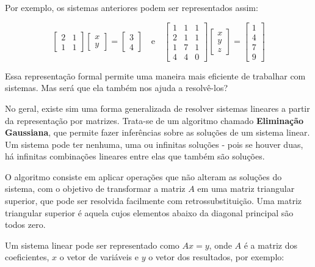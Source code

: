 \documentclass[11pt, a4paper]{article}
\begin{document}
Por exemplo, os sistemas anteriores podem ser representados assim:

\void[-0.5]

\[
\begin{bmatrix}
2 & 1\\
1 & 1
\end{bmatrix}
\begin{bmatrix}
x\\
y
\end{bmatrix}
=
\begin{bmatrix}
3\\
4
\end{bmatrix}
\quad \text{e} \quad
\begin{bmatrix}
1 & 1 & 1\\
2 & 1 & 1\\
1 & 7 & 1\\
4 & 4 & 0
\end{bmatrix}
\begin{bmatrix}
x\\
y\\
z
\end{bmatrix}
=
\begin{bmatrix}
1\\
4\\
7\\
9
\end{bmatrix}
\]

Essa representação formal permite uma maneira mais eficiente de trabalhar com sistemas. Mas será que ela também nos ajuda a resolvê-los?

No geral, existe sim uma forma generalizada de resolver sistemas lineares a partir da representação por matrizes. Trata-se de um algoritmo chamado \textbf{Eliminação Gaussiana}, que permite fazer inferências sobre as soluções de um sistema linear. Um sistema pode ter nenhuma, uma ou infinitas soluções - pois se houver duas, há infinitas combinações lineares entre elas que também são soluções.

O algoritmo consiste em aplicar operações que não alteram as soluções do sistema, com o objetivo de transformar a matriz \(A\) em uma matriz triangular superior, que pode ser resolvida facilmente com retrossubstituição. Uma matriz triangular superior é aquela cujos elementos abaixo da diagonal principal são todos zero.

Um sistema linear pode ser representado como \(Ax = y\), onde \(A\) é a matriz dos coeficientes, \(x\) o vetor de variáveis e \(y\) o vetor dos resultados, por exemplo:
\end{document}
